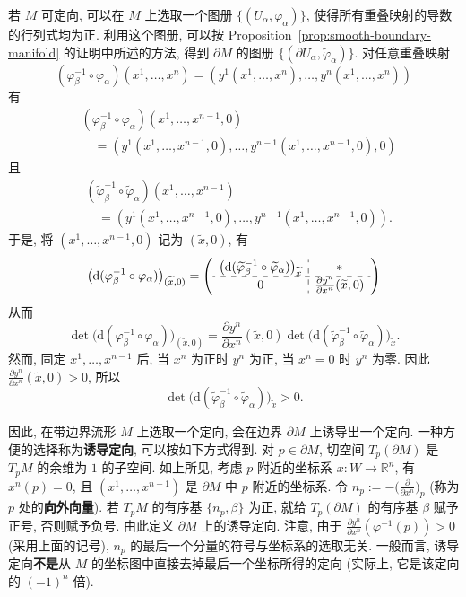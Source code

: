 \begin{RiemannProof}
若 $M$ 可定向, 可以在 $M$ 上选取一个图册 $\{(U_\alpha,\varphi_\alpha)\}$, 使得所有重叠映射的导数的行列式均为正. 利用这个图册, 可以按 Proposition~\ref{prop:smooth-boundary-manifold} 的证明中所述的方法, 得到 $\partial M$ 的图册 $\{(\partial U_\alpha,\widetilde\varphi_\alpha)\}$. 对任意重叠映射
\[
  (\varphi_\beta^{-1}\circ\varphi_\alpha)(x^1,\ldots,x^n)
  =(y^1(x^1,\ldots,x^n),\ldots,y^n(x^1,\ldots,x^n))
\]
有
\begin{align*}
  &(\varphi_\beta^{-1}\circ\varphi_\alpha)(x^1,\ldots,x^{n-1},0)\\
  &\quad=(y^1(x^1,\ldots,x^{n-1},0),\ldots,y^{n-1}(x^1,\ldots,x^{n-1},0),0)
\end{align*}
且
\begin{align*}
  &(\widetilde\varphi_\beta^{-1}\circ\widetilde\varphi_\alpha)(x^1,\ldots,x^{n-1})\\
  &\quad=(y^1(x^1,\ldots,x^{n-1},0),\ldots,y^{n-1}(x^1,\ldots,x^{n-1},0)).
\end{align*}
于是, 将 $(x^1,\ldots,x^{n-1},0)$ 记为 $(\widetilde x,0)$, 有
\[
  \bigl(\mathrm{d}(\varphi_\beta^{-1}\circ\varphi_\alpha)\bigr)_{(\widetilde x,0)}
   =\left(\begin{array}{c:c}
    \bigl(\mathrm{d}(\widetilde\varphi_\beta^{-1}\circ\widetilde\varphi_\alpha)\bigr)_{\widetilde x}&*\\
    \hdashline
    0&\frac{\partial y^n}{\partial x^n}(\widetilde x,0)
  \end{array}\right)
\]
从而
\[
  \det\bigl(\mathrm{d}(\varphi_\beta^{-1}\circ\varphi_\alpha)\bigr)_{(\widetilde x,0)}
  =\frac{\partial y^n}{\partial x^n}(\widetilde x,0)
    \det\bigl(\mathrm{d}(\widetilde\varphi_\beta^{-1}\circ\widetilde\varphi_\alpha)\bigr)_{\widetilde x}.
\]
然而, 固定 $x^1,\ldots,x^{n-1}$ 后, 当 $x^n$ 为正时 $y^n$ 为正, 当 $x^n=0$ 时 $y^n$ 为零. 因此 $\frac{\partial y^n}{\partial x^n}(\widetilde x,0)>0$, 所以
\[
  \det\bigl(\mathrm{d}(\widetilde\varphi_\beta^{-1}\circ\widetilde\varphi_\alpha)\bigr)_{\widetilde x}>0.
\]
\end{RiemannProof}

因此, 在带边界流形 $M$ 上选取一个定向, 会在边界 $\partial M$ 上诱导出一个定向. 一种方便的选择称为\textbf{诱导定向}, 可以按如下方式得到. 对 $p\in\partial M$, 切空间 $T_p(\partial M)$ 是 $T_pM$ 的余维为 $1$ 的子空间. 如上所见, 考虑 $p$ 附近的坐标系 $x:W\to\mathbb{R}^n$, 有 $x^n(p)=0$, 且 $(x^1,\ldots,x^{n-1})$ 是 $\partial M$ 中 $p$ 附近的坐标系. 令 $n_p:=-\bigl(\frac{\partial}{\partial x^n}\bigr)_p$ (称为 $p$ 处的\textbf{向外向量}). 若 $T_pM$ 的有序基 $\{n_p,\beta\}$ 为正, 就给 $T_p(\partial M)$ 的有序基 $\beta$ 赋予正号, 否则赋予负号. 由此定义 $\partial M$ 上的诱导定向. 注意, 由于 $\frac{\partial y^n}{\partial x^n}(\varphi^{-1}(p))>0$ (采用上面的记号), $n_p$ 的最后一个分量的符号与坐标系的选取无关. 一般而言, 诱导定向\textbf{不是}从 $M$ 的坐标图中直接去掉最后一个坐标所得的定向 (实际上, 它是该定向的 $(-1)^n$ 倍).

